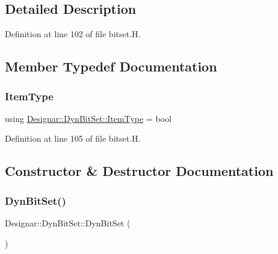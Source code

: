 \subsection{Detailed Description}


Definition at line 102 of file bitset.\+H.



\subsection{Member Typedef Documentation}
\mbox{\label{class_designar_1_1_dyn_bit_set_ad3f66987966a4fc27fec6d6ab552a1c7}} 
\subsubsection{\texorpdfstring{Item\+Type}{ItemType}}
{\footnotesize\ttfamily using \hyperlink{class_designar_1_1_dyn_bit_set_ad3f66987966a4fc27fec6d6ab552a1c7}{Designar\+::\+Dyn\+Bit\+Set\+::\+Item\+Type} =  bool}



Definition at line 105 of file bitset.\+H.



\subsection{Constructor \& Destructor Documentation}
\mbox{\label{class_designar_1_1_dyn_bit_set_a41e552380bd305a4069900b1e6b655e8}} 
\subsubsection{\texorpdfstring{Dyn\+Bit\+Set()}{DynBitSet()}\hspace{0.1cm}{\footnotesize\ttfamily [1/5]}}
{\footnotesize\ttfamily Designar\+::\+Dyn\+Bit\+Set\+::\+Dyn\+Bit\+Set (\begin{DoxyParamCaption}{ }\end{DoxyParamCaption})}



